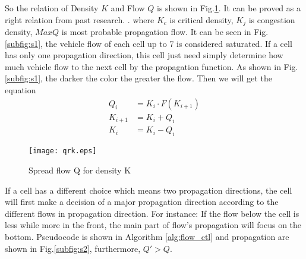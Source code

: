\documentclass{mcmthesis}
\begin{document}
So the relation of Density $K$ and Flow $Q$ is shown in Fig.\ref{fig:qrk}. 
It can be proved as a right relation from past research\cite{wiki:trafficflow}.
. where $K_c$ is critical density,  $K_j$ is congestion density, $ MaxQ$  is most probable propagation flow. It can be seen in Fig.\ref{subfig:s1}, the vehicle flow of each cell up to 7 is considered saturated. If a cell has only one propagation direction, this cell just need simply determine how much vehicle flow to the next cell by the propagation function. As shown in Fig.\ref{subfig:s1}, the darker the color
the greater the flow.
Then we will get the equation 
\begin{align*}
Q_i&=K_{i} \cdot F(K_{i+1})\\
K_{i+1}&=K_i+Q_i\\
K_{i}&=K_i-Q_i
\end{align*}
\begin{figure}[!htbp]
	\small
	\centering
	\texttt{[image: qrk.eps]}
	\caption{\label{fig:qrk}Spread flow Q for density K} 
\end{figure}

If a cell has a different choice which means two propagation directions, the cell will first make a decision of a major propagation direction according to the different flows in propagation direction. For instance: If the flow below the cell is less while more in the front, the main part of flow’s propagation will focus on the bottom. Pseudocode is shown in Algorithm \ref{alg:flow_ctl} and propagation are shown in Fig.\ref{subfig:s2}, furthermore, $Q' > Q.$
\end{document}
